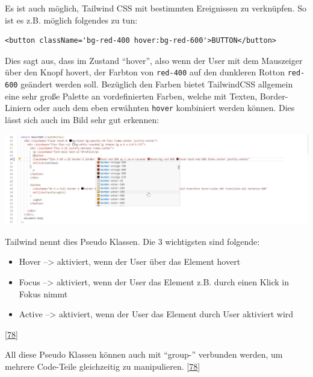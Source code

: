 \documentclass[
    headings=optiontotocandhead,%
    twoside,
    numbers=noenddot,%
    12pt, %
    titlepage, %
    parskip=full, %
    listof=leveldown, 
    numbers=noenddot, %
    a4paper,DIV=14,
    BCOR=15mm,
]{scrbook}
\newcommand{\passthrough}[1]{#1}
\let\origfigure=\figure
\let\endorigfigure=\endfigure
\renewenvironment{figure}[1][]{%
   \origfigure[H]
}{%
   \endorigfigure
}
\providecommand{\tightlist}{%
  \setlength{\itemsep}{0pt}\setlength{\parskip}{0pt}}
\begin{document}
Es ist auch möglich, Tailwind CSS mit bestimmten Ereignissen zu
verknüpfen. So ist es z.B. möglich folgendes zu tun:

\begin{lstlisting}[caption={Hover Funktion von Tailwind CSS}]
<button className='bg-red-400 hover:bg-red-600'>BUTTON</button>
\end{lstlisting}

Dies sagt aus, dass im Zustand ``hover'', also wenn der User mit dem
Mauszeiger über den Knopf hovert, der Farbton von
\passthrough{\lstinline!red-400!} auf den dunkleren Rotton
\passthrough{\lstinline!red-600!} geändert werden soll. Bezüglich den
Farben bietet TailwindCSS allgemein eine sehr große Palette an
vordefinierten Farben, welche mit Texten, Border-Liniern oder auch dem
eben erwähnten \passthrough{\lstinline!hover!} kombiniert werden können.
Dies lässt sich auch im Bild sehr gut erkennen:

\begin{figure}
\centering
\includegraphics{img/Gekle/TailwindCSS-Colors-Example.PNG}
\caption{Vordefinierte Farben von TailwindCSS}
\end{figure}

Tailwind nennt dies Pseudo Klassen. Die 3 wichtigsten sind folgende:

\begin{itemize}
\tightlist
\item
  Hover --\textgreater{} aktiviert, wenn der User über das Element
  hovert
\item
  Focus --\textgreater{} aktiviert, wenn der User das Element z.B. durch
  einen Klick in Fokus nimmt
\item
  Active --\textgreater{} aktiviert, wenn der User das Element durch
  User aktiviert wird
\end{itemize}

{[}\protect\hyperlink{ref-TailwindCSS-DocsV1}{78}{]}

All diese Pseudo Klassen können auch mit ``group-'' verbunden werden, um
mehrere Code-Teile gleichzeitig zu manipulieren.
{[}\protect\hyperlink{ref-TailwindCSS-DocsV1}{78}{]}
\end{document}
